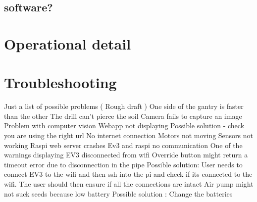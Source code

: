 \documentclass{article}
\begin{document}
\subsection{software?}


\section{Operational detail}\label{sec:detail}

\section{Troubleshooting}\label{sec:troubleshooting}
Just a list of possible problems ( Rough draft ) \newline
\newline
One side of the gantry is faster than the other \newline
The drill can’t pierce the soil \newline
Camera fails to capture an image \newline
Problem with computer vision \newline
Webapp not displaying \newline
Possible solution - check you are using the right url \newline
No internet connection \newline
Motors not moving \newline
Sensors not working \newline
Raspi web server crashes \newline
Ev3 and raspi no communication \newline
One of the warnings displaying \newline
EV3 disconnected from wifi \newline
Override button might return a timeout error due to disconnection in the pipe \newline
Possible solution: User needs to connect EV3 to the wifi and then ssh into the pi and check if its connected to the wifi. The user should then ensure if all the connections are intact \newline
Air pump might not suck seeds because low battery \newline
Possible solution : Change the batteries \newline






\end{document}
